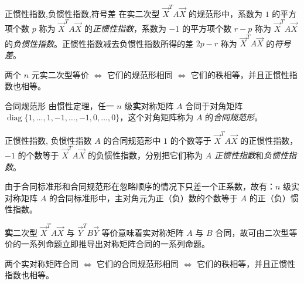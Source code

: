 \begin{definition}{正惯性指数,负惯性指数,符号差}
	在实二次型 $\vec X^T A \vec X$ 的规范形中，系数为 $1$ 的平方项个数 $p$ 称为 $\vec X^T A \vec X$ 的\emph{正惯性指数}，系数为 $-1$ 的平方项个数 $r - p$ 称为 $\vec X^T A \vec X$ 的\emph{负惯性指数}。正惯性指数减去负惯性指数所得的差 $2p - r$ 称为 $\vec X^T A \vec X$ 的\emph{符号差}。
\end{definition}

\begin{theorem}
	两个 $n$ 元实二次型等价 $\Longleftrightarrow$ 它们的规范形相同 $\Longleftrightarrow$ 它们的秩相等，并且正惯性指数也相等。
\end{theorem}

\begin{definition}{合同规范形}
	由惯性定理，任一 $n$ 级\textbf{实}对称矩阵 $A$ 合同于对角矩阵 $\operatorname{diag}\{1, \ldots, 1, -1, \ldots, -1, 0, \ldots, 0\}$，这个对角矩阵称为 $A$ 的\emph{合同规范形}。
\end{definition}

\begin{definition}{正惯性指数, 负惯性指数}
	$A$ 的合同规范形中 $1$ 的个数等于 $\vec X^T A \vec X$ 的正惯性指数，$-1$ 的个数等于 $\vec X^T A \vec X$ 的负惯性指数，分别把它们称为 $A$ \emph{正惯性指数}和\emph{负惯性指数}。
\end{definition}

由于合同标准形和合同规范形在忽略顺序的情况下只差一个正系数，故有：$n$ 级实对称矩阵 $A$ 的合同标准形中，主对角元为正（负）数的个数等于 $A$ 的正（负）惯性指数。

\bigskip

\textbf{实}二次型 $\vec X^T A \vec X$ 与 $\vec Y^T B \vec Y$ 等价意味着实对称矩阵 $A$ 与 $B$ 合同，故可由二次型等价的一系列命题立即推导出对称矩阵合同的一系列命题。

\begin{theorem}
	两个实对称矩阵合同 $\Longleftrightarrow$ 它们的合同规范形相同 $\Longleftrightarrow$ 它们的秩相等，并且正惯性指数也相等。
\end{theorem}

